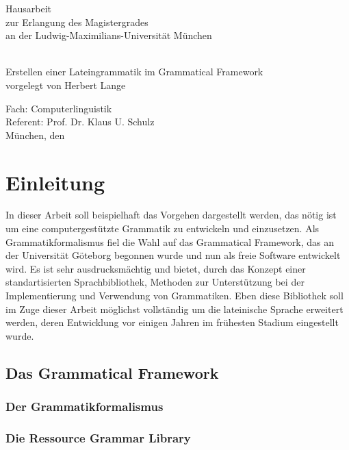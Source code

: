 \documentclass[draft,11pt]{amsbook}
\begin{document}
\setcounter{tocdepth}{3}
\date{30.9.2013}
\makeatletter

\begin{titlepage}
\begin{center}
\vspace{4cm}
\begin{huge}
Hausarbeit \\
zur Erlangung des Magistergrades \\
an der Ludwig-Maximilians-Universität München
\end{huge} \\[3cm]
{\Huge Erstellen einer Lateingrammatik im Grammatical Framework} \\[6cm]
{\LARGE vorgelegt von Herbert Lange} \\[5cm]
\end{center}
\parindent0mm
\begin{huge} 
Fach: Computerlinguistik  \\[0.3cm]
Referent: Prof. Dr. Klaus U. Schulz \\[0.3cm]
München, den \@date 
\end{huge}
\end{titlepage}
\makeatother
\tableofcontents
\section{Einleitung}
In dieser Arbeit soll beispielhaft das Vorgehen dargestellt werden, das nötig ist um eine computergestützte Grammatik zu entwickeln und einzusetzen. Als Grammatikformalismus fiel die Wahl auf das Grammatical Framework, das an der Universität Göteborg begonnen wurde und nun als freie Software entwickelt wird. Es ist sehr ausdrucksmächtig und bietet, durch das Konzept einer standartisierten Sprachbibliothek, Methoden zur Unterstützung bei der Implementierung und Verwendung von Grammatiken. Eben diese Bibliothek soll im Zuge dieser Arbeit möglichst vollständig um die lateinische Sprache erweitert werden, deren Entwicklung vor einigen Jahren im frühesten Stadium eingestellt wurde. 
\subsection{Das Grammatical Framework}
\subsubsection{Der Grammatikformalismus}
\subsubsection{Die Ressource Grammar Library}
\end{document}
